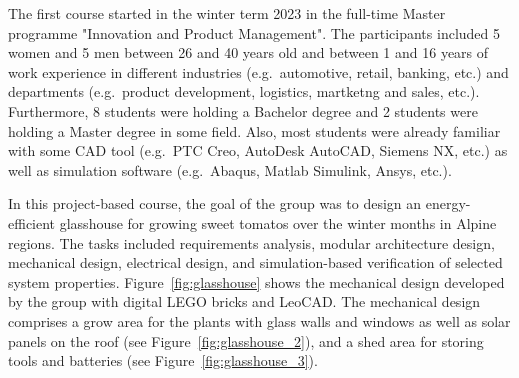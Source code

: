 \documentclass{PDS}
\begin{document}
The first course started in the winter term 2023 in the full-time Master programme "Innovation and Product Management".
The participants included 5 women and 5 men between 26 and 40 years old and between 1 and 16 years of work experience in different industries (e.g.\ automotive, retail, banking, etc.) and departments (e.g.\ product development, logistics, martketng and sales, etc.).
Furthermore, 8 students were holding a Bachelor degree and 2 students were holding a Master degree in some field.
Also, most students were already familiar with some CAD tool (e.g.\ PTC Creo, AutoDesk AutoCAD, Siemens NX, etc.) as well as simulation software (e.g.\ Abaqus, Matlab Simulink, Ansys, etc.).

In this project-based course, the goal of the group was to design an energy-efficient glasshouse for growing sweet tomatos over the winter months in Alpine regions.
The tasks included requirements analysis, modular architecture design, mechanical design, electrical design, and simulation-based verification of selected system properties.
Figure~\ref{fig:glasshouse} shows the mechanical design developed by the group with digital LEGO bricks and LeoCAD.
The mechanical design comprises a grow area for the plants with glass walls and windows as well as solar panels on the roof (see Figure~\ref{fig:glasshouse_2}), and a shed area for storing tools and batteries (see Figure~\ref{fig:glasshouse_3}).
\end{document}
